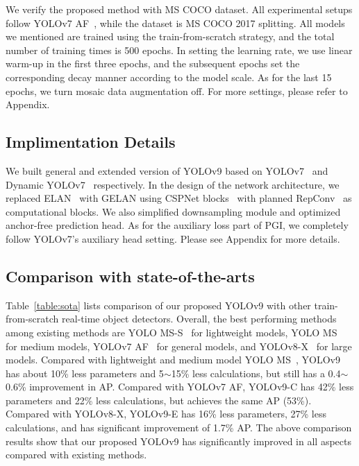 \documentclass[10pt,twocolumn,letterpaper]{article}
\begin{document}
	We verify the proposed method with MS COCO dataset. All experimental setups follow YOLOv7 AF~\cite{wang2023yolov7}, while the dataset is MS COCO 2017 splitting. All models we mentioned are trained using the train-from-scratch strategy, and the total number of training times is 500 epochs. In setting the learning rate, we use linear warm-up in the first three epochs, and the subsequent epochs set the corresponding decay manner according to the model scale. As for the last 15 epochs, we turn mosaic data augmentation off. For more settings, please refer to Appendix.
	
	\subsection{Implimentation Details}
	
	We built general and extended version of YOLOv9 based on YOLOv7~\cite{wang2023yolov7} and Dynamic YOLOv7~\cite{lin2023dynamicdet} respectively. In the design of the network architecture, we replaced ELAN~\cite{wang2023designing} with GELAN using CSPNet blocks~\cite{wang2020cspnet} with planned RepConv~\cite{wang2023yolov7} as computational blocks. We also simplified downsampling module and optimized anchor-free prediction head. As for the auxiliary loss part of PGI, we completely follow YOLOv7's auxiliary head setting. Please see Appendix for more details.
	
	\newpage
	
	\subsection{Comparison with state-of-the-arts}
	\label{sec:cmp}
	
	\vspace{-6pt}
	
	Table~\ref{table:sota} lists comparison of our proposed YOLOv9 with other train-from-scratch real-time object detectors. Overall, the best performing methods among existing methods are YOLO MS-S~\cite{chen2023yolo} for lightweight models, YOLO MS~\cite{chen2023yolo} for medium models, YOLOv7 AF~\cite{wang2023yolov7} for general models, and YOLOv8-X~\cite{glenn2024yolov8} for large models. Compared with lightweight and medium model YOLO MS~\cite{chen2023yolo}, YOLOv9 has about 10\% less parameters and 5$\sim$15\% less calculations, but still has a 0.4$\sim$0.6\% improvement in AP. Compared with YOLOv7 AF, YOLOv9-C has 42\% less parameters and 22\% less calculations, but achieves the same AP (53\%). Compared with YOLOv8-X, YOLOv9-E has 16\% less parameters, 27\% less calculations, and has significant improvement of 1.7\% AP. The above comparison results show that our proposed YOLOv9 has significantly improved in all aspects compared with existing methods.
	
\end{document}
